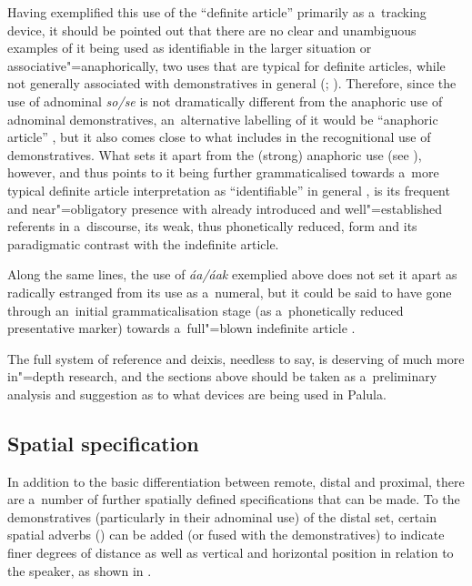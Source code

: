 Having exemplified this use of the ``definite article'' primarily as a~tracking device, it should be pointed out that there are no clear and unambiguous examples of it being used as identifiable in the larger situation or associative"=anaphorically, two uses that are typical for definite articles, while not generally associated with demonstratives in general (\citealt[485]{juvonen2006}; \citealt[233]{himmelmann1996}). Therefore, since the use of adnominal \textit{so/se} is not dramatically different from the anaphoric use of adnominal demonstratives, an~alternative labelling of it would be ``anaphoric article'' \citep[486]{juvonen2006}, but it also comes close to what \citet[230--239]{himmelmann1996} includes in the recognitional use of demonstratives. What sets it apart from the (strong) anaphoric use (see ), however, and thus points to it being further grammaticalised towards a~more typical definite article interpretation as ``identifiable'' in general \citep[485]{juvonen2006}, is its frequent and near"=obligatory presence with already introduced and well"=established referents in a~discourse, its weak, thus phonetically reduced, form and its paradigmatic contrast with the indefinite article.


Along the same lines, the use of \textit{áa/áak} exemplied above does not set it apart as radically estranged from its use as a~numeral, but it could be said to have gone through an~initial grammaticalisation stage (as a~phonetically reduced presentative marker) towards a~full"=blown indefinite article \citep[486]{juvonen2006}.



The full system of reference and deixis, needless to say, is deserving of much more in"=depth research, and the sections above should be taken as a~preliminary analysis and suggestion as to what devices are being used in Palula.


\subsection{Spatial specification}
\label{subsec:5-2-7}

In addition to the basic differentiation between remote, distal and proximal, there are a~number of further spatially defined specifications that can be made. To the demonstratives (particularly in their adnominal use) of the distal set, certain spatial adverbs () can be added (or fused with the demonstratives) to indicate finer degrees of distance as well as vertical and horizontal position in relation to the speaker, as shown in .



